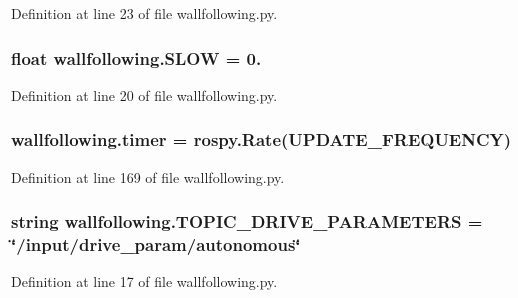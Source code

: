 Definition at line 23 of file wallfollowing.\+py.

\subsubsection[{\texorpdfstring{S\+L\+OW}{SLOW}}]{\setlength{\rightskip}{0pt plus 5cm}float wallfollowing.\+S\+L\+OW = 0.}\hypertarget{namespacewallfollowing_a30a4013dbd3a6ea5275fbed3fe35da22}{}\label{namespacewallfollowing_a30a4013dbd3a6ea5275fbed3fe35da22}


Definition at line 20 of file wallfollowing.\+py.

\subsubsection[{\texorpdfstring{timer}{timer}}]{\setlength{\rightskip}{0pt plus 5cm}wallfollowing.\+timer = rospy.\+Rate({\bf U\+P\+D\+A\+T\+E\+\_\+\+F\+R\+E\+Q\+U\+E\+N\+CY})}\hypertarget{namespacewallfollowing_a57288dd797e0bd15012f3ebf1670ce38}{}\label{namespacewallfollowing_a57288dd797e0bd15012f3ebf1670ce38}


Definition at line 169 of file wallfollowing.\+py.

\subsubsection[{\texorpdfstring{T\+O\+P\+I\+C\+\_\+\+D\+R\+I\+V\+E\+\_\+\+P\+A\+R\+A\+M\+E\+T\+E\+RS}{TOPIC_DRIVE_PARAMETERS}}]{\setlength{\rightskip}{0pt plus 5cm}string wallfollowing.\+T\+O\+P\+I\+C\+\_\+\+D\+R\+I\+V\+E\+\_\+\+P\+A\+R\+A\+M\+E\+T\+E\+RS = \char`\"{}/input/drive\+\_\+param/autonomous\char`\"{}}\hypertarget{namespacewallfollowing_a765ce45df7d0c3d9134fc83534029e36}{}\label{namespacewallfollowing_a765ce45df7d0c3d9134fc83534029e36}


Definition at line 17 of file wallfollowing.\+py.

